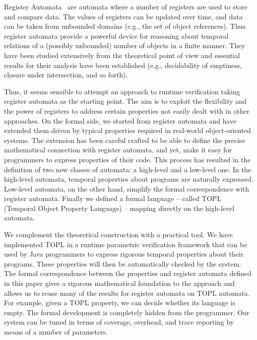 \documentclass[9pt, preprint]{sigplanconf} %
\theoremstyle{definition}
\theoremstyle{remark}
\begin{document}
Register Automata~\cite{dblp:conf/focs/kaminskif90} are automata where
a number of registers are used to store and compare data. The values
of registers can be updated over time, and data can be taken from unbounded domains (e.g., the set of object references). Thus register automata provide a powerful device for reasoning about temporal 
relations of a (possibly unbounded) number of objects in a finite manner. They have been studied extensively from the theoretical point of
view and essential results for their analysis have been established (e.g., decidability of emptiness, closure under intersection, and so forth).

Thus, it seems sensible to attempt an approach to runtime verification
taking register automata as the starting point. The aim is to
exploit the flexibility and the power of registers to
address certain properties not easily dealt with in other approaches.
On the formal side, we started from register automata and have extended them driven by typical properties required in real-world object-oriented systems.
The extension has been careful crafted to be able to define the precise mathematical connection with register automata, and yet,
make it easy for programmers to express properties of their code. This process has resulted in the definition of two new classes of 
automata: a high-level and a low-level one. In the high-level automata, temporal properties about programs are naturally expressed. Low-level automata, 
on the other hand, simplify the formal correspondence with  register automata. 
Finally we defined a formal language -- called TOPL (Temporal Object Property Language) -- mapping directly on the 
high-level automata.

We complement the theoretical construction with a practical tool.
We have implemented TOPL  in a runtime parametric verification framework that can be used by Java programmers to express rigorous temporal 
properties about their programs. These properties will then be automatically checked by the system.
The formal correspondence between the properties and register automata
defined in this paper gives a rigorous mathematical foundation to
the approach and allows us to reuse many of the results for register automata on TOPL automata. For example, given a TOPL property, we can decide whether its language is empty.  The formal development is completely hidden from 
the programmer.  
Our system can be tuned  in terms of coverage,  overhead, and trace reporting by means of a number of parameters. 
\end{document}
